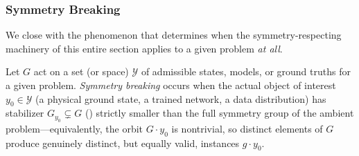 \documentclass[mathematics,review,submit,moreauthors]{Definitions/mdpi}
\begin{document}
\subsubsection{Symmetry Breaking}
\label{subsec:symmetry-breaking}

We close with the phenomenon that determines when the symmetry-respecting
machinery of this entire section applies to a given problem \emph{at all}.

\begin{Definition}
\label{def:symmetry-breaking}
Let $G$ act on a set (or space) $\mathcal{Y}$ of admissible states, models, or ground
truths for a given problem. \emph{Symmetry breaking} occurs when the actual
object of interest $y_0 \in \mathcal{Y}$ (a physical ground state, a trained network,
a data distribution) has stabilizer $G_{y_0} \subsetneq G$
() strictly smaller than the full
symmetry group of the ambient problem---equivalently, the orbit
$G \cdot y_0$ is nontrivial, so distinct elements of $G$ produce genuinely
distinct, but equally valid, instances $g \cdot y_0$.
\end{Definition}
\end{document}
